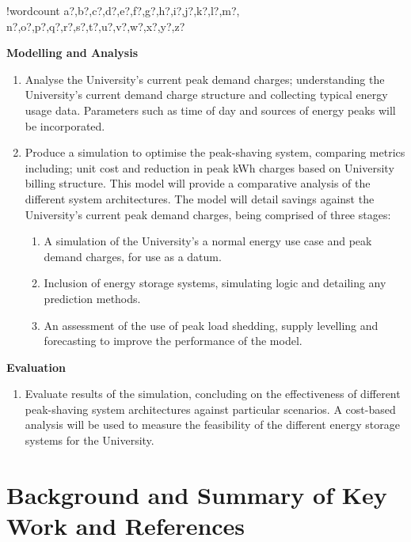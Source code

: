 \documentclass[fontsize=9.5pt]{extarticle}
\numberwithin{figure}{section} %
\newcounter{words}
\newenvironment{counted}{%
  \setcounter{words}{0}
  \SearchList!{wordcount}{\stepcounter{words}}
    {a?,b?,c?,d?,e?,f?,g?,h?,i?,j?,k?,l?,m?,
    n?,o?,p?,q?,r?,s?,t?,u?,v?,w?,x?,y?,z?}
  \UndoBoundary{'}
  \SearchOrder{p;}}{%
  \StopSearching}
\begin{document}
\begin{counted}
\begin{enumerate}[resume]
\end{enumerate}

\textbf{Modelling and Analysis}

\begin{enumerate}[resume]
\item Analyse the University’s current peak demand charges; understanding the University’s current demand charge structure and collecting typical energy usage data. Parameters such as time of day and sources of energy peaks will be incorporated.
\item Produce a simulation to optimise the peak-shaving system, comparing metrics including; unit cost and reduction in peak kWh charges based on University billing structure. This model will provide a comparative analysis of the different system architectures. The model will detail savings against the University’s current peak demand charges, being comprised of three stages:
\begin{enumerate}
\item A simulation of the University's a normal energy use case and peak demand charges, for use as a datum.
\item Inclusion of energy storage systems, simulating logic and detailing any prediction methods.
\item An assessment of the use of peak load shedding, supply levelling and forecasting to improve the performance of the model.
\end{enumerate}
\end{enumerate}

\textbf{Evaluation}

\begin{enumerate}[resume]
\item Evaluate results of the simulation, concluding on the effectiveness of different peak-shaving system architectures against particular scenarios. A cost-based analysis will be used to measure the feasibility of the different energy storage systems for the University.
\end{enumerate}

\newpage

\section{Background and Summary of Key Work and
References}\label{background-and-summary-of-key-work-and-references}


\end{counted}
\end{document}
